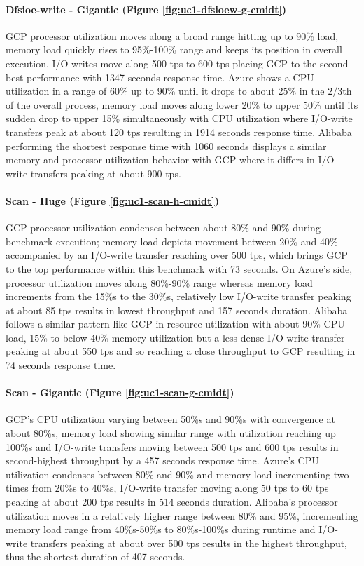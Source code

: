 \documentclass[review]{elsarticle}
\begin{document}
\paragraph{Dfsioe-write - Gigantic (Figure \ref{fig:uc1-dfsioew-g-cmidt})}GCP processor utilization moves along a broad range hitting up to 90\% load, memory load quickly rises to 95\%-100\% range and keeps its position in overall execution, I/O-writes move along 500 tps to 600 tps placing GCP to the second-best performance with 1347 seconds response time. Azure shows a CPU utilization in a range of 60\% up to 90\% until it drops to about 25\% in the 2/3th of the overall process, memory load moves along lower 20\% to upper 50\% until its sudden drop to upper 15\% simultaneously with CPU utilization where I/O-write transfers peak at about 120 tps resulting in 1914 seconds response time. Alibaba performing the shortest response time with 1060 seconds displays a similar memory and processor utilization behavior with GCP where it differs in I/O-write transfers peaking at about 900 tps.

\paragraph{Scan - Huge (Figure \ref{fig:uc1-scan-h-cmidt})}GCP processor utilization condenses between about 80\% and 90\% during benchmark execution; memory load depicts movement between 20\% and 40\% accompanied by an I/O-write transfer reaching over 500 tps, which brings GCP to the top performance within this benchmark with 73 seconds. On Azure's side, processor utilization moves along 80\%-90\% range whereas memory load increments from the 15\%s to the 30\%s, relatively low I/O-write transfer peaking at about 85 tps results in lowest throughput and 157 seconds duration. Alibaba follows a similar pattern like GCP in resource utilization with about 90\% CPU load, 15\% to below 40\% memory utilization but a less dense I/O-write transfer peaking at about 550 tps and so reaching a close throughput to GCP resulting in 74 seconds response time.

\paragraph{Scan - Gigantic (Figure \ref{fig:uc1-scan-g-cmidt})}GCP's CPU utilization varying between 50\%s and 90\%s with convergence at about 80\%s, memory load showing similar range with utilization reaching up 100\%s and I/O-write transfers moving between 500 tps and 600 tps results in second-highest throughput by a 457 seconds response time. Azure's CPU utilization condenses between 80\% and 90\% and memory load incrementing two times from 20\%s to 40\%s, I/O-write transfer moving along 50 tps to 60 tps peaking at about 200 tps results in 514 seconds duration. Alibaba's processor utilization moves in a relatively higher range between 80\% and 95\%, incrementing memory load range from 40\%s-50\%s to 80\%s-100\%s during runtime and I/O-write transfers peaking at about over 500 tps results in the highest throughput, thus the shortest duration of 407 seconds.
\end{document}
